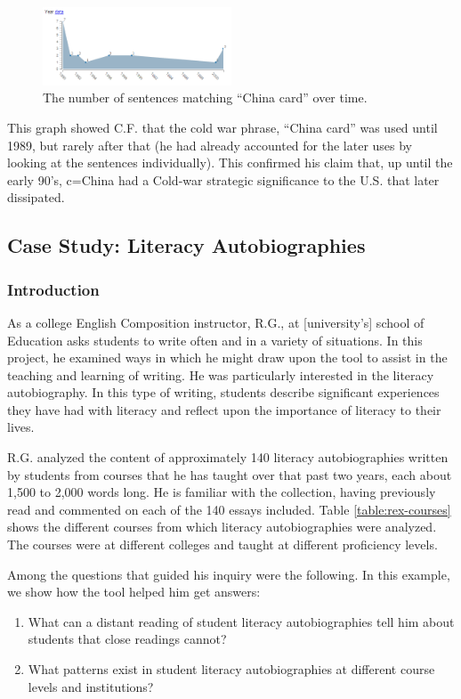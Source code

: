 \documentclass{sig-alternate}
\begin{document}
\begin{figure}[h!]
\includegraphics[width=0.5\textwidth]{fig/chris/02.png}
\caption{ The number of sentences matching ``China card'' over time. \label{fig:chris02}}
\end{figure}

This graph showed C.F. that the cold war phrase, ``China card'' was used until 1989, but rarely  after that (he had already accounted for the later uses by looking at the sentences individually). This confirmed his claim that, up until the early 90's, c=China had a Cold-war strategic significance to the U.S. that later dissipated.

\subsection{Case Study: Literacy Autobiographies}

\subsubsection{Introduction}
As a college English Composition instructor,  R.G., at  [university's] school of Education asks students to write often and in a variety of situations. In this project, he examined ways in which he might draw upon the tool to assist in the teaching and learning of writing. He was particularly interested in the literacy autobiography. In this type of writing, students describe significant experiences they have had with literacy and reflect upon the importance of literacy to their lives.  

R.G. analyzed the content of approximately 140 literacy autobiographies written by students from courses that he has taught over that past two years, each about 1,500 to 2,000 words long. He is familiar with the collection, having previously read and commented on each of the 140 essays included.  Table \ref{table:rex-courses} shows the different courses from which literacy autobiographies were analyzed. The courses were at different colleges and taught at different proficiency levels.

Among the questions that guided his inquiry were the following. In this example, we show how the tool helped him get answers:
\begin{enumerate}
\item What can a distant reading of student literacy autobiographies tell him about students that close readings cannot?
\item What patterns exist in student literacy autobiographies at different course levels and institutions?
\end{enumerate}
\end{document}
